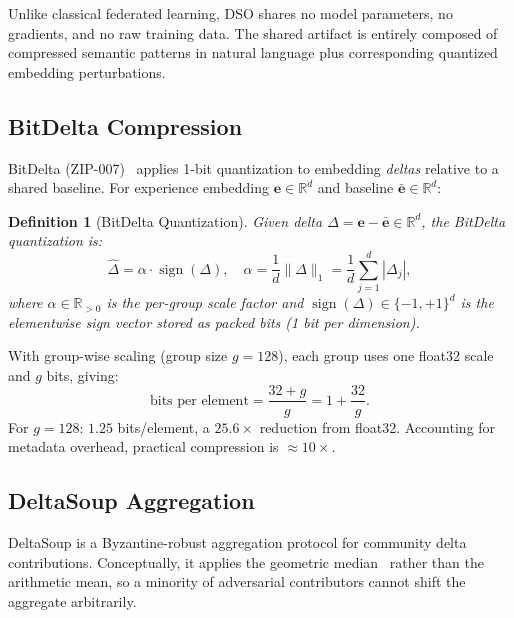 \documentclass[11pt]{article}
\newtheorem{definition}{Definition}
\DeclareMathOperator{\sign}{sign}
\begin{document}
Unlike classical federated learning, DSO shares no model parameters, no
gradients, and no raw training data. The shared artifact is entirely composed
of compressed semantic patterns in natural language plus corresponding
quantized embedding perturbations.

\subsection{BitDelta Compression}
\label{sec:background-bitdelta}

BitDelta (ZIP-007)~\cite{hanzo2026bitdelta} applies 1-bit quantization to
embedding \emph{deltas} relative to a shared baseline. For experience embedding
$\bm{e} \in \mathbb{R}^d$ and baseline $\bar{\bm{e}} \in \mathbb{R}^d$:

\begin{definition}[BitDelta Quantization]
\label{def:bitdelta}
Given delta $\Delta = \bm{e} - \bar{\bm{e}} \in \mathbb{R}^d$, the BitDelta
quantization is:
\begin{equation}
    \widehat{\Delta} = \alpha \cdot \sign(\Delta),
    \quad \alpha = \frac{1}{d} \|\Delta\|_1 = \frac{1}{d}\sum_{j=1}^d |\Delta_j|,
    \label{eq:bitdelta}
\end{equation}
where $\alpha \in \mathbb{R}_{>0}$ is the per-group scale factor and
$\sign(\Delta) \in \{-1, +1\}^d$ is the elementwise sign vector stored as
packed bits (1 bit per dimension).
\end{definition}

With group-wise scaling (group size $g = 128$), each group uses one float32
scale and $g$ bits, giving:
\begin{equation}
    \text{bits per element} = \frac{32 + g}{g} = 1 + \frac{32}{g}.
\end{equation}
For $g = 128$: $1.25$ bits/element, a $25.6\times$ reduction from float32.
Accounting for metadata overhead, practical compression is ${\approx}10\times$.

\subsection{DeltaSoup Aggregation}
\label{sec:background-deltasoup}

DeltaSoup is a Byzantine-robust aggregation protocol for community delta
contributions. Conceptually, it applies the geometric median~\cite{minsker2015geometric}
rather than the arithmetic mean, so a minority of adversarial contributors
cannot shift the aggregate arbitrarily.
\end{document}
